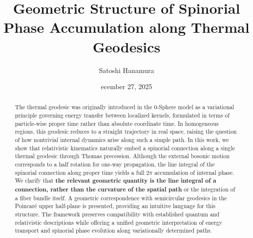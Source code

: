 \documentclass[%
 reprint,
 amsmath,amssymb,
 aps,
 prb,
]{revtex4-2}
\numberwithin{equation}{section}
\begin{document}
\title{Geometric Structure of Spinorial Phase Accumulation along Thermal Geodesics}

\author{Satoshi Hanamura}
\date{ecember 27, 2025}

\begin{abstract}
The thermal geodesic was originally introduced in the 0-Sphere model as a variational principle governing energy transfer between localized kernels, formulated in terms of particle-wise proper time rather than absolute coordinate time. 
In homogeneous regions, this geodesic reduces to a straight trajectory in real space, raising the question of how nontrivial internal dynamics arise along such a simple path. 
In this work, we show that relativistic kinematics naturally embed a spinorial connection along a single thermal geodesic through Thomas precession. 
Although the external bosonic motion corresponds to a half rotation for one-way propagation, the line integral of the spinorial connection along proper time yields a full $2\pi$ accumulation of internal phase. 
We clarify that \textbf{the relevant geometric quantity is the line integral of a connection, rather than the curvature of the spatial path} or the integration of a fiber bundle itself. 
A geometric correspondence with semicircular geodesics in the Poincaré upper half-plane is presented, providing an intuitive language for this structure. 
The framework preserves compatibility with established quantum and relativistic descriptions while offering a unified geometric interpretation of energy transport and spinorial phase evolution along variationally determined paths.
\end{abstract}

\end{document}
